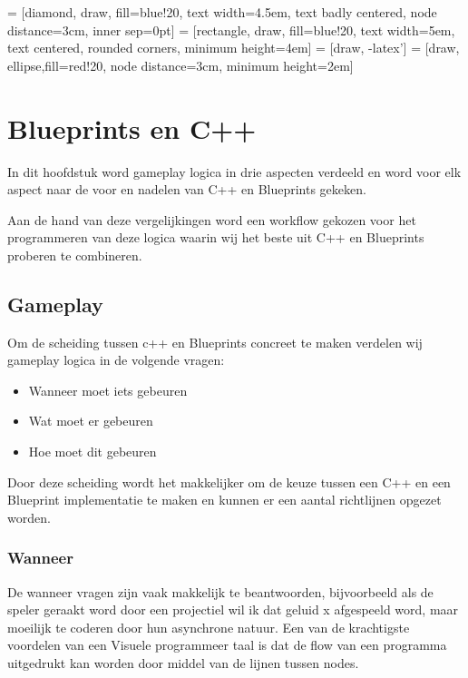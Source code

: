 \lstset {language=C++}
 = [diamond, draw, fill=blue!20, 
    text width=4.5em, text badly centered, node distance=3cm, inner sep=0pt]
 = [rectangle, draw, fill=blue!20, 
    text width=5em, text centered, rounded corners, minimum height=4em]
 = [draw, -latex']
 = [draw, ellipse,fill=red!20, node distance=3cm,
    minimum height=2em]

\chapter{Blueprints en C++}

In dit hoofdstuk word gameplay logica in drie aspecten verdeeld en word voor elk aspect naar de voor en nadelen van C++ en Blueprints gekeken.

Aan de hand van deze vergelijkingen word een workflow gekozen voor het programmeren van deze logica waarin wij het beste uit C++ en Blueprints proberen te combineren.

\section{Gameplay}

Om de scheiding tussen c++ en Blueprints concreet te maken verdelen wij gameplay logica in de volgende vragen:

\begin{itemize}
	\item Wanneer moet iets gebeuren
	\item Wat moet er gebeuren
	\item Hoe moet dit gebeuren
\end{itemize}

Door deze scheiding wordt het makkelijker om de keuze tussen een C++ en een Blueprint implementatie te maken en kunnen er een aantal richtlijnen opgezet worden.

\subsection{Wanneer}
De wanneer vragen zijn vaak makkelijk te beantwoorden, bijvoorbeeld als de speler geraakt word door een projectiel wil ik dat geluid x afgespeeld word, maar moeilijk te coderen door hun asynchrone natuur. Een van de krachtigste voordelen van een Visuele programmeer taal is dat de flow van een programma uitgedrukt kan worden door middel van de lijnen tussen nodes. 

